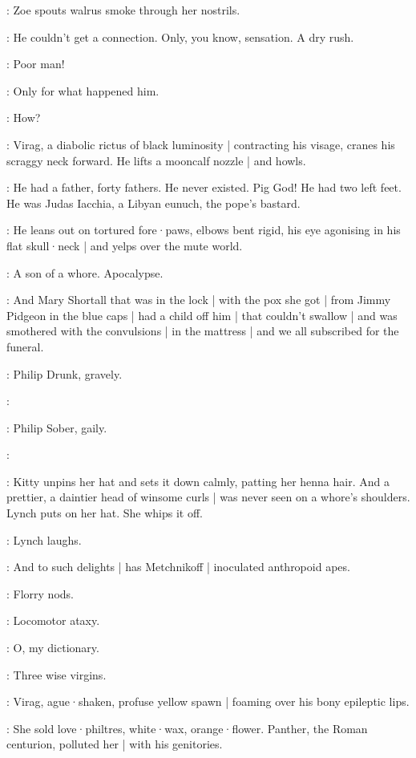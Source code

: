 :
Zoe spouts walrus smoke through her nostrils.

\Zoe:
He couldn't get a connection.
Only,
you know,
sensation.
A dry rush.

\Bloom:
Poor man!

\Zoe:
Only for what happened him.

\Bloom:
How?

:
Virag,
a diabolic rictus of black luminosity |
contracting his visage,
cranes his scraggy neck forward.
He lifts a mooncalf nozzle |
and howls.

\Virag:
He had a father,
forty fathers.
He never existed.
Pig God!
He had two left feet.
He was Judas Iacchia,
a Libyan eunuch,
the pope's bastard.

:
He leans out on tortured fore·paws,
elbows bent rigid,
his eye agonising in his flat skull·neck |
and yelps over the mute world.

\Virag:
A son of a whore.
Apocalypse.

\Kitty[2]:
And Mary Shortall that was in the lock |
with the pox she got |
from Jimmy Pidgeon in the blue caps |
had a child off him |
that couldn't swallow |
and was smothered with the convulsions |
in the mattress |
and we all subscribed for the funeral.

:
Philip Drunk,
gravely.

\PhilipDrunk:

:
Philip Sober,
gaily.

\PhilipSober:

:
Kitty unpins her hat and sets it down calmly,
patting her henna hair.
And a prettier,
a daintier head of winsome curls |
was never seen on a whore's shoulders.
Lynch puts on her hat.
She whips it off.

:
Lynch laughs.

\Lynch:
And to such delights |
has Metchnikoff |
inoculated anthropoid apes.

:
Florry nods.

\Florry:
Locomotor ataxy.

\Zoe:
O,
my dictionary.

\Lynch:
Three wise virgins.

:
Virag,
ague·shaken,
profuse yellow spawn |
foaming over his bony epileptic lips.

\Virag:
She sold love·philtres,
white·wax,
orange·flower.
Panther,
the Roman centurion,
polluted her |
with his genitories.

